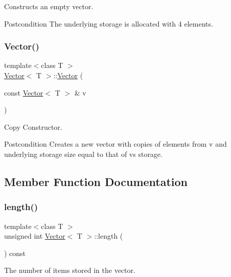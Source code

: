 Constructs an empty vector. 

\begin{DoxyPostcond}{Postcondition}
The underlying storage is allocated with 4 elements. 
\end{DoxyPostcond}
\mbox{\label{classVector_aa1671acb623cf2259dd60cf81db4f56a}} 
\subsubsection{\texorpdfstring{Vector()}{Vector()}\hspace{0.1cm}{\footnotesize\ttfamily [2/2]}}
{\footnotesize\ttfamily template$<$class T $>$ \\
\hyperlink{classVector}{Vector}$<$ T $>$\+::\hyperlink{classVector}{Vector} (\begin{DoxyParamCaption}\item[{const \hyperlink{classVector}{Vector}$<$ T $>$ \&}]{v }\end{DoxyParamCaption})}



Copy Constructor. 

\begin{DoxyPostcond}{Postcondition}
Creates a new vector with copies of elements from v and underlying storage size equal to that of v\textquotesingle{}s storage. 
\end{DoxyPostcond}


\subsection{Member Function Documentation}
\mbox{\label{classVector_af15b2f88e9cc1f54cdb2759db37c13c2}} 
\subsubsection{\texorpdfstring{length()}{length()}}
{\footnotesize\ttfamily template$<$class T $>$ \\
unsigned int \hyperlink{classVector}{Vector}$<$ T $>$\+::length (\begin{DoxyParamCaption}{ }\end{DoxyParamCaption}) const}



The number of items stored in the vector. 

